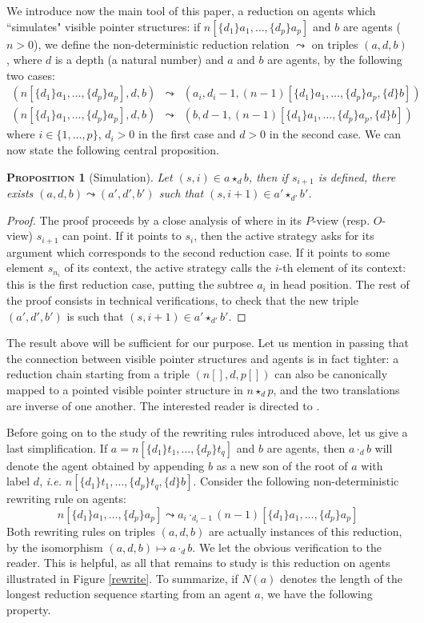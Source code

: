 \documentclass{article}
\newtheorem{proposition}{\textsc{Proposition}}
\begin{document}
We introduce now the main tool of this paper, a reduction on agents which ``simulates" visible pointer structures: if $n[\{d_1\}a_1, \dots, \{d_p\}a_p]$ and $b$ are agents ($n>0$),
we define the non-deterministic reduction relation $\leadsto$ on triples $(a, d, b)$, where $d$ is a depth (a natural number) and $a$ and $b$ are agents, by the following two cases:
\begin{eqnarray*}
(n[\{d_1\}a_1, \dots, \{d_p\}a_p],d, b) &\leadsto& (a_i,d_i-1,(n-1)[\{d_1\}a_1, \dots, \{d_p\}a_p, \{d\}b])\\
(n[\{d_1\}a_1, \dots, \{d_p\}a_p],d, b) &\leadsto& (b, d-1, (n-1)[\{d_1\}a_1, \dots, \{d_p\}a_p, \{d\}b])
\end{eqnarray*}
where $i\in \{1, \dots , p\}$, $d_i>0$ in the first case and $d>0$ in the second case. We can now state the following central proposition.

\begin{proposition}[Simulation]
Let $(s,i)\in a\star_d b$, then if $s_{i+1}$ is defined, there exists $(a,d,b)\leadsto (a',d',b')$ such that $(s, i+1)\in a'\star_{d'} b'$.
\end{proposition}
\begin{proof}
The proof proceeds by a close analysis of where in its $P$-view (resp. $O$-view) $s_{i+1}$ can point. If it points to $s_i$, then the active strategy
asks for its argument which corresponds to the second reduction case. If it points to some element $s_{n_i}$ of its context, the active strategy calls the $i$-th
element of its context: this is the first reduction case, putting the subtree $a_i$ in head position. The rest of the proof consists in technical verifications,
to check that the new triple $(a', d', b')$ is such that $(s, i+1)\in a'\star_{d'} b'$.
\end{proof}

The result above will be sufficient for our purpose. Let us mention in passing that the connection between visible pointer structures
and agents is in fact tighter: a reduction chain starting from a triple $(n[], d, p[])$ can also be canonically mapped to a pointed visible pointer structure in $n\star_d p$,
and the two translations are inverse of one another. The interested reader is directed to \cite{phd}.

Before going on to the study of the rewriting rules introduced above, let us give a last simplification. If $a = n[\{d_1\}t_1, \dots, \{d_p\}t_q]$ and $b$ are agents,
then $a\cdot_d b$ will denote the agent obtained by appending $b$ as a new son of the root of $a$ with label $d$, \emph{i.e.} $n[\{d_1\}t_1, \dots, \{d_p\}t_q, \{d\}b]$.
Consider the following non-deterministic rewriting rule on agents:
\[
n[\{d_1\}a_1, \dots, \{d_p\}a_p] \leadsto a_i \cdot_{d_i - 1} (n-1)[\{d_1\}a_1, \dots, \{d_p\}a_p]
\]
Both rewriting rules on triples $(a, d, b)$ are actually instances of this reduction, by the isomorphism $(a, d, b) \mapsto a \cdot_d b$. We let the obvious verification
to the reader. This is helpful, as all that remains to study is this reduction on agents illustrated in Figure \ref{rewrite}. To summarize, if $N(a)$ denotes the length of the longest reduction sequence
starting from an agent $a$, we have the following property.
\end{document}
